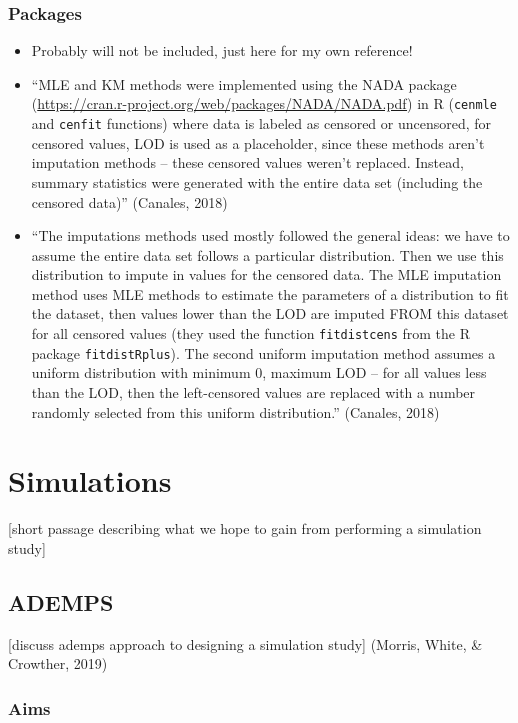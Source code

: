 \documentclass[12pt, twoside]{amherstthesis}
\begin{document}
\hypertarget{packages}{%
\subsection{Packages}\label{packages}}
\begin{itemize}
\item
  Probably will not be included, just here for my own reference!
\item
  ``MLE and KM methods were implemented using the NADA package (\url{https://cran.r-project.org/web/packages/NADA/NADA.pdf}) in R (\texttt{cenmle} and \texttt{cenfit} functions) where data is labeled as censored or uncensored, for censored values, LOD is used as a placeholder, since these methods aren't imputation methods -- these censored values weren't replaced. Instead, summary statistics were generated with the entire data set (including the censored data)'' (Canales, 2018)
\item
  ``The imputations methods used mostly followed the general ideas: we have to assume the entire data set follows a particular distribution. Then we use this distribution to impute in values for the censored data. The MLE imputation method uses MLE methods to estimate the parameters of a distribution to fit the dataset, then values lower than the LOD are imputed FROM this dataset for all censored values (they used the function \texttt{fitdistcens} from the R package \texttt{fitdistRplus}). The second uniform imputation method assumes a uniform distribution with minimum 0, maximum LOD -- for all values less than the LOD, then the left-censored values are replaced with a number randomly selected from this uniform distribution.'' (Canales, 2018)
\end{itemize}
\hypertarget{simulations}{%
\chapter{Simulations}\label{simulations}}

{[}short passage describing what we hope to gain from performing a simulation study{]}

\hypertarget{ademps}{%
\section{ADEMPS}\label{ademps}}

{[}discuss ademps approach to designing a simulation study{]} (Morris, White, \& Crowther, 2019)

\hypertarget{aims}{%
\subsection{Aims}\label{aims}}
\end{document}
